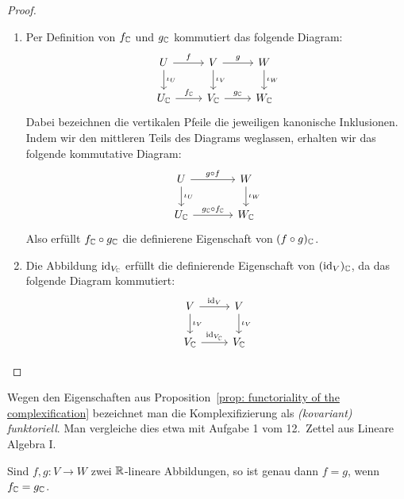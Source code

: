 \documentclass[a4paper,10pt,numbers=noenddot]{scrartcl}
\begin{document}
\begin{proof}
  \begin{enumerate}[leftmargin=*]
    \item
      Per Definition von $f_{\mathbb{C}}$ und $g_{\mathbb{C}}$ kommutiert das folgende Diagram:
      \[
      \begin{tikzcd}
          U       \arrow[r, "f"]  \arrow[d, "\iota_U"]
        & V       \arrow[r, "g"]  \arrow[d, "\iota_V"]
        & W                       \arrow[d, "\iota_W"]
        \\
          U_\Cbb  \arrow[r, "f_\Cbb"]
        & V_\Cbb  \arrow[r, "g_\Cbb"]
        & W_\Cbb
      \end{tikzcd}
      \]
      Dabei bezeichnen die vertikalen Pfeile die jeweiligen kanonische Inklusionen.
      Indem wir den mittleren Teils des Diagrams weglassen, erhalten wir das folgende kommutative Diagram:
      \[
      \begin{tikzcd}[column sep=large]
          U       \arrow[r, "g \circ f"]            \arrow[d, "\iota_U"]
        & W                                         \arrow[d, "\iota_W"]
        \\
          U_\Cbb  \arrow[r, "g_\Cbb \circ f_\Cbb"]
        & W_\Cbb
      \end{tikzcd}
      \]
      Also erfüllt $f_{\mathbb{C}} \circ g_{\mathbb{C}}$ die definierene Eigenschaft von $(f \circ g)_{\mathbb{C}}$.
    \item
      Die Abbildung $\operatorname{id}_{V_{\mathbb{C}}}$ erfüllt die definierende Eigenschaft von $(\operatorname{id}_V)_{\mathbb{C}}$, da das folgende Diagram kommutiert:
      \[
      \begin{tikzcd}
          V       \arrow[r, "\id_V"]        \arrow[d, "\iota_V"]
        & V                                 \arrow[d, "\iota_V"]
        \\
          V_\Cbb  \arrow[r, "\id_{V_\Cbb}"]
        & V_\Cbb
      \end{tikzcd}
      \]
  \end{enumerate}
\end{proof}


\begin{remark}
  Wegen den Eigenschaften aus Proposition~\ref{prop: functoriality of the complexification} bezeichnet man die Komplexifizierung als \emph{(kovariant) funktoriell}.
  Man vergleiche dies etwa mit Aufgabe 1 vom 12.\ Zettel aus Lineare Algebra I.
\end{remark}



\begin{lemma}\label{lemma: complexification is faithful}
  Sind $f, g \colon V \to W$ zwei $\mathbb{R}$-lineare Abbildungen, so ist genau dann $f = g$, wenn $f_{\mathbb{C}} = g_{\mathbb{C}}$.
\end{lemma}
\end{document}
